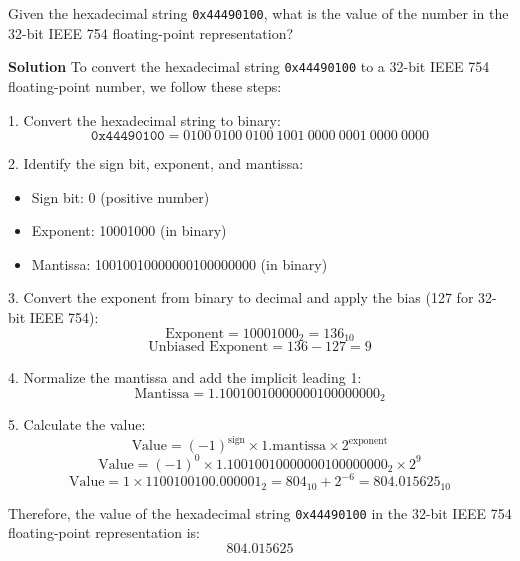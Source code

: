 Given the hexadecimal string \texttt{0x44490100}, what is the value of the number in the 32-bit IEEE 754 floating-point representation?

\textbf{Solution}
To convert the hexadecimal string \texttt{0x44490100} to a 32-bit IEEE 754 floating-point number, we follow these steps:

1. Convert the hexadecimal string to binary:
\[
\texttt{0x44490100} = 0100\ 0100\ 0100\ 1001\ 0000\ 0001\ 0000\ 0000
\]

2. Identify the sign bit, exponent, and mantissa:
\begin{itemize}
    \item Sign bit: 0 (positive number)
    \item Exponent: 10001000 (in binary)
    \item Mantissa: 10010010000000100000000 (in binary)
\end{itemize}

3. Convert the exponent from binary to decimal and apply the bias (127 for 32-bit IEEE 754):
\[
\text{Exponent} = 10001000_2 = 136_{10}
\]
\[
\text{Unbiased Exponent} = 136 - 127 = 9
\]

4. Normalize the mantissa and add the implicit leading 1:
\[
\text{Mantissa} = 1.10010010000000100000000_2
\]

5. Calculate the value:
\[
\text{Value} = (-1)^{\text{sign}} \times 1.\text{mantissa} \times 2^{\text{exponent}}
\]
\[
\text{Value} = (-1)^0 \times 1.10010010000000100000000_2 \times 2^9
\]
\[
\text{Value} = 1 \times 1100100100.000001_2 = 804_{10} + 2^{-6} = 804.015625_{10}
\]

Therefore, the value of the hexadecimal string \texttt{0x44490100} in the 32-bit IEEE 754 floating-point representation is:
\[
    804.015625
\]